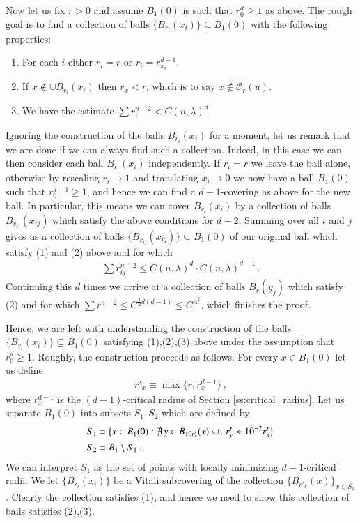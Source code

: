 \documentclass[11pt]{article}
\begin{document}
Now let us fix $r>0$ and assume $B_1(0)$ is such that $r^d_0\geq 1$ as above.  The rough goal is to find a collection of balls $\{B_{r_i}(x_i)\}\subseteq B_1(0)$ with the following properties:
\begin{enumerate}
\item For each $i$ either $r_i=r$ or $r_i = r_{x_i}^{d-1}$.
\item If $x\not\in \cup B_{r_i}(x_i)$ then $r_x<r$, which is to say $x\not\in {\mathcal{C}}_r(u)$.
\item We have the estimate $\sum r_i^{n-2} < C(n,\lambda)^d$.
\end{enumerate}
Ignoring the construction of the balls $B_{r_i}(x_i)$ for a moment, let us remark that we are done if we can always find such a collection.  Indeed, in this case we can then consider each ball $B_{r_i}(x_i)$ independently.  If $r_i=r$ we leave the ball alone, otherwise by rescaling $r_i\to 1$ and translating $x_i\to 0$ we now have a ball $B_1(0)$ such that $r^{d-1}_0\geq 1$, and hence we can find a $d-1$-covering as above for the new ball.  In particular, this means we can cover $B_{r_i}(x_i)$ by a collection of balls $B_{r_{ij}}(x_{ij})$ which satisfy the above conditions for $d-2$.  Summing over all $i$ and $j$ gives us a collection of balls $\{B_{r_{ij}}(x_{ij})\}\subseteq B_1(0)$ of our original ball which satisfy (1) and (2) above and for which
\begin{align}
\sum r_{ij}^{n-2}\leq C(n,\lambda)^{d}\cdot C(n,\lambda)^{d-1}\, .
\end{align}
 Continuing this $d$ times we arrive at a collection of balls $B_r(y_j)$ which satisfy (2) and for which $\sum r^{n-2} \leq C^{\frac{1}{2}d(d-1)}\leq C^{\Lambda^2}$, which finishes the proof.

Hence, we are left with understanding the construction of the balls $\{B_{r_i}(x_i)\}\subseteq B_1(0)$ satisfying (1),(2),(3) above under the assumption that $r_0^{d}\geq 1$.  Roughly, the construction proceeds as follows.  For every $x\in B_1(0)$ let us define
\begin{align}
r'_x \equiv \max\{r, r_x^{d-1}\}\, ,
\end{align}
where $r^{d-1}_x$ is the $(d-1)$-critical radius of Section \ref{ss:critical_radius}.  Let us separate $B_1(0)$ into subsets $S_1,S_2$ which are defined by
\begin{align}
&S_1\equiv\{x\in B_1(0): \not\exists\, y\in B_{10 r'_x}(x) \text{ s.t. } r'_y<10^{-2}r'_x\}\, \notag\\
&S_2\equiv B_1\setminus S_1\, .
\end{align}
We can interpret $S_1$ as the set of points with locally minimizing $d-1$-critical radii.  We let $\{B_{r_i}(x_i)\}$ be a Vitali subcovering of the collection $\{B_{r'_x}(x)\}_{x\in S_1}$.  Clearly the collection satisfies (1), and hence we need to show this collection of balls satisfies (2),(3).
\end{document}
